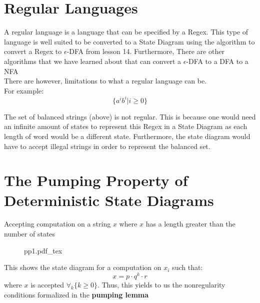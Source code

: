 \documentclass[12pt]{book}
\title{\coursetitle\linebreak\lecturename}
\author{\\Cain Susko\\ 
           \\ \\ \\
      Queen's University 
    \\School of Computing\\}
\newcommand{\incfig}[1]{%
    {#1.pdf_tex}
}
\begin{document}
\begin{titlepage}
        \maketitle
\end{titlepage}


\section*{Regular Languages}
A regular language is a language that can be specified by a Regex. This type of language is well suited to be 
        converted to a State Diagram using the algorithm to convert a Regex to $\epsilon$-DFA from lesson 14. 
Furthermore, There are other algorithms that we have learned about that can convert a $\epsilon$-DFA to a DFA to a NFA\\
There are however, limitations to what a regular language can be.\\
For example:
\[\{a^ib^i | i \geq 0\}\]

The set of balanced strings (above) is not regular. 
This is because one would need an infinite amount of states to represent this Regex in a State Diagram 
        as each length of word would be a different state. 
Furthermore, the state diagram would have to accept illegal strings in order to represent the balanced set.

\section*{The Pumping Property of Deterministic State Diagrams}
Accepting computation on a string $x$ where $x$ has a length greater than the number of states
\begin{figure}[h]
        \centering
        \incfig{pp1}
\end{figure}

This shows the state diagram for a computation on $x_i$ such that:
\[x=p\cdot q^k\cdot r\]
where $x$ is accepted  $\forall_k\{k\geq 0\}$.
{\small Thus, this yields to us the nonregularity conditions formalized in the \textbf{pumping lemma}}
\end{document}
